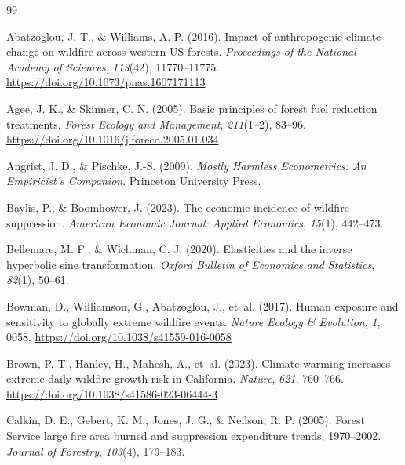 \documentclass[12pt, letterpaper]{article}
\begin{document}
\newpage
\singlespacing
\begin{thebibliography}{99}

Abatzoglou, J. T., \& Williams, A. P. (2016). Impact of anthropogenic climate change on wildfire across western US forests. \textit{Proceedings of the National Academy of Sciences}, \textit{113}(42), 11770--11775. \url{https://doi.org/10.1073/pnas.1607171113}

Agee, J. K., \& Skinner, C. N. (2005). Basic principles of forest fuel reduction treatments. \textit{Forest Ecology and Management}, \textit{211}(1--2), 83--96. \url{https://doi.org/10.1016/j.foreco.2005.01.034}

Angrist, J. D., \& Pischke, J.-S. (2009). \textit{Mostly Harmless Econometrics: An Empiricist's Companion}. Princeton University Press.

Baylis, P., \& Boomhower, J. (2023). The economic incidence of wildfire suppression. \textit{American Economic Journal: Applied Economics}, \textit{15}(1), 442--473.

Bellemare, M. F., \& Wichman, C. J. (2020). Elasticities and the inverse hyperbolic sine transformation. \textit{Oxford Bulletin of Economics and Statistics}, \textit{82}(1), 50--61.

Bowman, D., Williamson, G., Abatzoglou, J., et~al. (2017). Human exposure and sensitivity to globally extreme wildfire events. \textit{Nature Ecology \& Evolution}, \textit{1}, 0058. \url{https://doi.org/10.1038/s41559-016-0058}

Brown, P. T., Hanley, H., Mahesh, A., et~al. (2023). Climate warming increases extreme daily wildfire growth risk in California. \textit{Nature}, \textit{621}, 760--766. \url{https://doi.org/10.1038/s41586-023-06444-3}

Calkin, D. E., Gebert, K. M., Jones, J. G., \& Neilson, R. P. (2005). Forest Service large fire area burned and suppression expenditure trends, 1970--2002. \textit{Journal of Forestry}, \textit{103}(4), 179--183.


\end{thebibliography}
\end{document}
